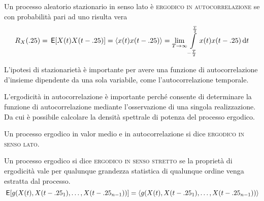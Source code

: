 \begin{definizione}
Un processo aleatorio stazionario in senso lato è \textsc{ergodico in autocorrelazione} se con probabilità pari ad uno risulta vera
\begin{equation}
R_X(.25)=\,{\operatorname{\mathsf{E}}}\!\left[{X(t)X(t-.25)}\right]=\langle x(t)x(t-.25)\rangle=\lim\limits_{T\to\infty}\int\limits_{-\frac{T}{2}}^{\frac{T}{2}}{x(t)x(t-.25)}{\,\mathop{}\!\mathrm{d}{t}}
\end{equation}
\end{definizione}
L'ipotesi di stazionarietà è importante per avere una funzione di autocorrelazione d'insieme dipendente da una sola variabile, come l'autocorrelazione temporale.

L'ergodicità in autocorrelazione è importante perché consente di determinare la funzione di autocorrelazione mediante l'osservazione di una singola realizzazione. Da cui è possibile calcolare la densità spettrale di potenza del processo ergodico.

\begin{definizione}
Un processo ergodico in valor medio e in autocorrelazione si dice \textsc{ergodico in senso lato}.
\end{definizione}


\begin{definizione}
Un processo ergodico si dice \textsc{ergodico in senso stretto} se la proprietà di ergodicità vale per qualunque grandezza statistica di qualunque ordine venga estratta dal processo.
\[\,{\operatorname{\mathsf{E}}}\!\left[{g(X(t),X(t-.25_1),\dots,X(t-.25_{n-1}))}\right]=\langle g(X(t),X(t-.25_1),\dots,X(t-.25_{n-1}))\rangle\]
\end{definizione}

